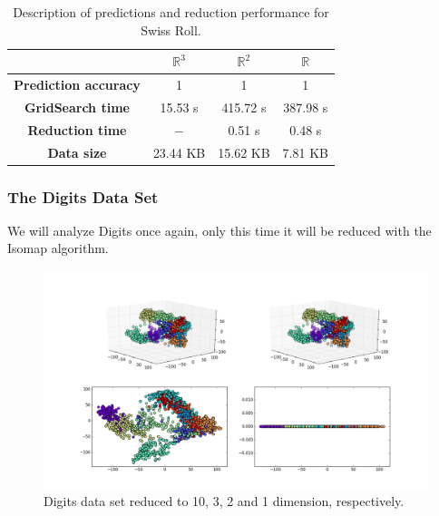 \documentclass[12pt]{article}
\begin{document}
\begin{table}[H]
	\centering
	\begin{tabular}{|c|c|c|c|}
		\hline
		& \textbf{$\mathbb{R}^3$} & \textbf{$\mathbb{R}^2$} & \textbf{$\mathbb{R}$} \\\hline
		\textbf{Prediction accuracy}   & 1            & 1             & 1     \\\hline
		\textbf{GridSearch time} & 15.53 s   & 415.72 s  & 387.98 s  \\\hline
		\textbf{Reduction time}  & $-$         & 0.51 s       & 0.48 s     \\\hline
		\textbf{Data size}          & 23.44 KB & 15.62 KB  & 7.81 KB   \\\hline
	\end{tabular}

	\caption{Description of predictions and reduction performance for Swiss Roll.}
\end{table}

\subsubsection{The Digits Data Set}

We will analyze Digits once again, only this time it will be reduced with the Isomap algorithm.

\begin{figure}[H]
	\centering
	\includegraphics[width=\linewidth]{dsdigitsiso}
	\captionsetup{justification=centering}
	\caption{Digits data set reduced to 10, 3, 2 and 1 dimension, respectively.}
	\label{fig:dsdigitsiso}
\end{figure}
\end{document}

